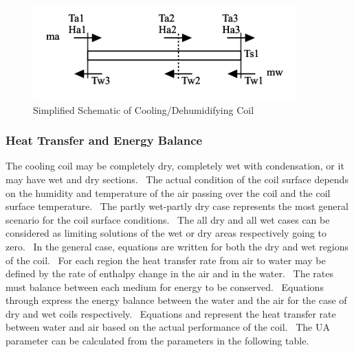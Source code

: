 \begin{figure}[hbtp] %
\centering
\includegraphics[width=0.9\textwidth, height=0.9\textheight, keepaspectratio=true]{media/image3352.svg.png}
\caption{Simplified Schematic of Cooling/Dehumidifying Coil \protect \label{fig:simplified-schematic-of-coolingdehumidifying-001}}
\end{figure}

\subsubsection{Heat Transfer and Energy Balance}\label{heat-transfer-and-energy-balance-1}

The cooling coil may be completely dry, completely wet with condensation, or it may have wet and dry sections.~ The actual condition of the coil surface depends on the humidity and temperature of the air passing over the coil and the coil surface temperature.~ The partly wet-partly dry case represents the most general scenario for the coil surface conditions.~ The all dry and all wet cases can be considered as limiting solutions of the wet or dry areas respectively going to zero.~ In the general case, equations are written for both the dry and wet regions of the coil.~ For each region the heat transfer rate from air to water may be defined by the rate of enthalpy change in the air and in the water.~ The rates must balance between each medium for energy to be conserved.~ Equations through express the energy balance between the water and the air for the case of dry and wet coils respectively.~ Equations and represent the heat transfer rate between water and air based on the actual performance of the coil.~ The UA parameter can be calculated from the parameters in the following table.

